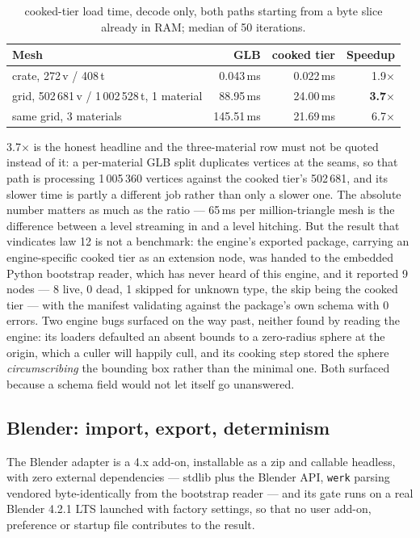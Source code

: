 \documentclass[10pt,twocolumn,letterpaper]{article}
\newcommand{\code}[1]{\texttt{\small #1}}
\begin{document}
\begin{table}[t]\centering\footnotesize
\caption{cooked-tier load time, decode only, both paths starting from a byte slice already in RAM; median of 50 iterations.}
\begin{tabular}{@{}L{3.0cm} r r r@{}}
\toprule
Mesh & GLB & cooked tier & Speedup \\
\midrule
crate, 272\,v / 408\,t & 0.043\,ms & 0.022\,ms & 1.9$\times$ \\
grid, 502\,681\,v / 1\,002\,528\,t, 1 material & 88.95\,ms & 24.00\,ms & \textbf{3.7$\times$} \\
same grid, 3 materials & 145.51\,ms & 21.69\,ms & 6.7$\times$ \\
\bottomrule
\end{tabular}
\end{table}

3.7$\times$ is the honest headline and the three-material row must not be quoted instead of it: a per-material GLB split duplicates vertices at the seams, so that path is processing 1\,005\,360 vertices against the cooked tier's 502\,681, and its slower time is partly a different job rather than only a slower one. The absolute number matters as much as the ratio --- 65\,ms per million-triangle mesh is the difference between a level streaming in and a level hitching. But the result that vindicates law 12 is not a benchmark: the engine's exported package, carrying an engine-specific cooked tier as an extension node, was handed to the embedded Python bootstrap reader, which has never heard of this engine, and it reported 9 nodes --- 8 live, 0 dead, 1 skipped for unknown type, the skip being the cooked tier --- with the manifest validating against the package's own schema with 0 errors. Two engine bugs surfaced on the way past, neither found by reading the engine: its loaders defaulted an absent bounds to a zero-radius sphere at the origin, which a culler will happily cull, and its cooking step stored the sphere \emph{circumscribing} the bounding box rather than the minimal one. Both surfaced because a schema field would not let itself go unanswered.

\subsection{Blender: import, export, determinism}

The Blender adapter is a 4.x add-on, installable as a zip and callable headless, with zero external dependencies --- stdlib plus the Blender API, \code{werk} parsing vendored byte-identically from the bootstrap reader --- and its gate runs on a real Blender 4.2.1 LTS launched with factory settings, so that no user add-on, preference or startup file contributes to the result.
\end{document}
